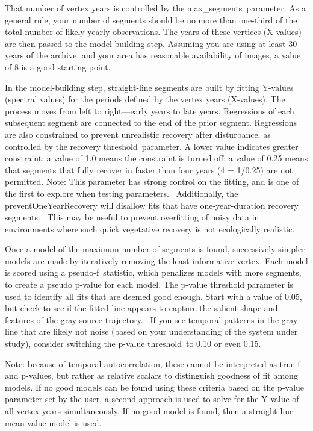 \documentclass[
  letterpaper,
  DIV=11,
  numbers=noendperiod]{scrreprt}
\begin{document}
That number of vertex years is controlled by the
max\_segments~parameter. As a general rule, your number of segments
should be no more than one-third of the total number of likely yearly
observations. The years of these vertices (X-values) are then passed to
the model-building step. Assuming you are using at least 30 years of the
archive, and your area has reasonable availability of images, a value of
8 is a good starting point.

In the model-building step, straight-line segments are built by fitting
Y-values (spectral values) for the periods defined by the vertex years
(X-values). The process moves from left to right---early years to late
years. Regressions of each subsequent segment are connected to the end
of the prior segment. Regressions are also constrained to prevent
unrealistic recovery after disturbance, as controlled by the recovery
threshold~parameter. A lower value indicates greater constraint: a value
of 1.0 means the constraint is turned off; a value of 0.25 means that
segments that fully recover in faster than four years (4 = 1/0.25) are
not permitted. Note: This parameter has strong control on the fitting,
and is one of the first to explore when testing parameters.
~Additionally, the preventOneYearRecovery will disallow fits that have
one-year-duration recovery segments. ~This may be useful to prevent
overfitting of noisy data in environments where such quick vegetative
recovery is not ecologically realistic.

Once a model of the maximum number of segments is found, successively
simpler models are made by iteratively removing the least informative
vertex. Each model is scored using a pseudo-f~statistic, which penalizes
models with more segments, to create a pseudo p-value for each model.
The p-value threshold parameter is used to identify all fits that are
deemed good enough. Start with a value of 0.05, but check to see if the
fitted line appears to capture the salient shape and features of the
gray source trajectory. ~If you see temporal patterns in the gray line
that are likely not noise (based on your understanding of the system
under study), consider switching the p-value threshold~to 0.10 or even
0.15.~

Note: because of temporal autocorrelation, these cannot be interpreted
as true f- and p-values, but rather as relative scalars to distinguish
goodness of fit among models. If no good models can be found using these
criteria based on the p-value parameter set by the user, a second
approach is used to solve for the Y-value of all vertex years
simultaneously. If no good model is found, then a straight-line mean
value model is used.
\end{document}
